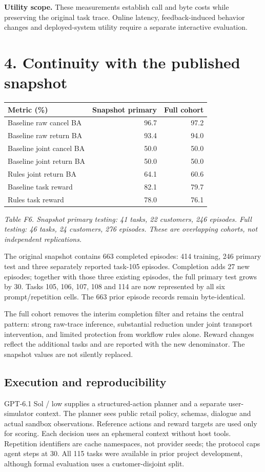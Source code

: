 \documentclass[10pt,letterpaper]{article}
\begin{document}
\textbf{Utility scope.} These measurements establish call and byte costs while preserving the original task trace. Online latency, feedback-induced behavior changes and deployed-system utility require a separate interactive evaluation.

\clearpage\section*{4. Continuity with the published snapshot}

\begin{center}\small
\begin{tabular}{@{}lrr@{}}\toprule
Metric (\%) & Snapshot primary & Full cohort\\\midrule
Baseline raw cancel BA & 96.7 & 97.2\\
Baseline raw return BA & 93.4 & 94.0\\
Baseline joint cancel BA & 50.0 & 50.0\\
Baseline joint return BA & 50.0 & 50.0\\
Rules joint return BA & 64.1 & 60.6\\
Baseline task reward & 82.1 & 79.7\\
Rules task reward & 78.0 & 76.1\\
\bottomrule\end{tabular}
\end{center}
\noindent\textit{Table F6. Snapshot primary testing: 41 tasks, 22 customers, 246 episodes. Full testing: 46 tasks, 24 customers, 276 episodes. These are overlapping cohorts, not independent replications.}
\par\medskip

The original snapshot contains 663 completed episodes: 414 training, 246 primary test and three separately reported task-105 episodes. Completion adds 27 new episodes; together with those three existing episodes, the full primary test grows by 30. Tasks 105, 106, 107, 108 and 114 are now represented by all six prompt/repetition cells. The 663 prior episode records remain byte-identical.

The full cohort removes the interim completion filter and retains the central pattern: strong raw-trace inference, substantial reduction under joint transport intervention, and limited protection from workflow rules alone. Reward changes reflect the additional tasks and are reported with the new denominator. The snapshot values are not silently replaced.

\subsection*{Execution and reproducibility}
GPT-6.1 Sol / low supplies a structured-action planner and a separate user-simulator context. The planner sees public retail policy, schemas, dialogue and actual sandbox observations. Reference actions and reward targets are used only for scoring. Each decision uses an ephemeral context without host tools. Repetition identifiers are cache namespaces, not provider seeds; the protocol caps agent steps at 30. All 115 tasks were available in prior project development, although formal evaluation uses a customer-disjoint split.
\end{document}
